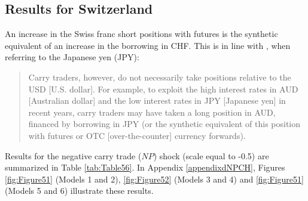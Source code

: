 \documentclass[a4paper, twoside]{templates/ociamthesis}
\begin{document}
\hypertarget{fivethreeone}{%
\subsection{Results for Switzerland}\label{fivethreeone}}

An increase in the Swiss franc short positions with futures is the synthetic equivalent of an increase in the borrowing in CHF. This is in line with \textcite[ 320]{brunnermeier2008}, when referring to the Japanese yen (JPY):

\begin{quote}
Carry traders, however, do not necessarily take positions relative to the USD {[}U.S. dollar{]}. For example, to exploit the high interest rates in AUD {[}Australian dollar{]} and the low interest rates in JPY {[}Japanese yen{]} in recent years, carry traders may have taken a long position in AUD, financed by borrowing in JPY (or the synthetic equivalent of this position with futures or OTC {[}over-the-counter{]} currency forwards).
\end{quote}

Results for the negative carry trade (\(NP\)) shock (scale equal to -0.5) are summarized in Table \ref{tab:Table56}. In Appendix \ref{appendixdNPCH}, Figures \ref{fig:Figure51} (Models 1 and 2), \ref{fig:Figure52} (Models 3 and 4) and \ref{fig:Figure51} (Models 5 and 6) illustrate these results.
\end{document}
